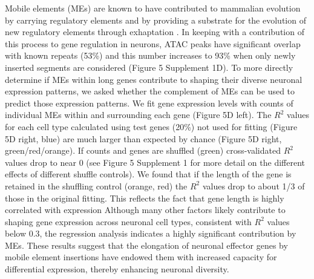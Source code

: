 Mobile elements (MEs) are known to have contributed to mammalian evolution by carrying regulatory elements \citep{Johnson_2006,Chuong_2016a} and by providing a substrate for the evolution of new regulatory elements through exhaptation \citep{Mikkelsen_2007,Sasaki_2008}. In keeping with a contribution of this process to gene regulation in neurons, ATAC peaks have significant overlap with known repeats (53\%) and this number increases to 93\% when only newly inserted segments are considered (Figure 5 Supplement 1D). To more directly determine if MEs within long genes contribute to shaping their diverse neuronal expression patterns, we asked whether the complement of MEs can be used to predict those expression patterns. We fit gene expression levels with counts of individual MEs within and surrounding each gene (Figure 5D left). The $R^2$ values for each cell type calculated using test genes (20\%) not used for fitting (Figure 5D right, blue) are much larger than expected by chance (Figure 5D right, green/red/orange). If counts and genes are shuffled (green) cross-validated $R^2$ values drop to near 0 (see Figure 5 Supplement 1 for more detail on the different effects of different shuffle controls). 
We found that if the length of the gene is retained in the shuffling control (orange, red) the $R^2$ values drop to about 1/3 of those in the original fitting. This reflects the fact that gene length is highly correlated with expression
Although many other factors likely contribute to shaping gene expression across neuronal cell types, consistent with $R^2$ values below 0.3, the regression analysis indicates a highly significant contribution by MEs. These results suggest that the elongation of neuronal effector genes by mobile element insertions have endowed them with increased capacity for differential expression, thereby  enhancing neuronal diversity. 

